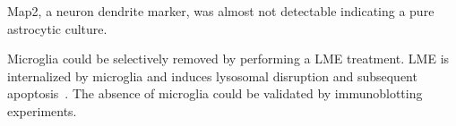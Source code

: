 \documentclass[a4paper,11pt,bibtotocnumbered]{article}
\begin{document}

Map2, a neuron dendrite marker, was almost not detectable indicating a pure astrocytic culture.

Microglia could be selectively removed by performing a LME treatment. LME is internalized by microglia and induces lysosomal disruption and subsequent apoptosis~\cite{Jebelli2015}. The absence of microglia could be validated by immunoblotting experiments.


\newpage
\renewcommand\bibname{}

\end{document}
